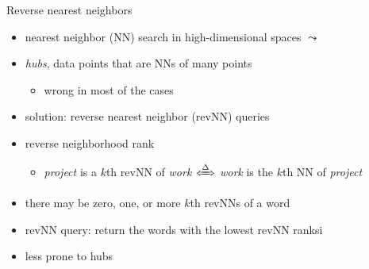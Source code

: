 \documentclass[10pt]{beamer}%
\newcommand{\bull}[1]{\begin{itemize}\item #1 \end{itemize}}
\begin{document}
\begin{frame}{Reverse nearest neighbors}
  \begin{itemize}
    \item nearest neighbor (NN) search in high-dimensional spaces $\leadsto$
    \item \emph{hubs}, data points that are NNs of many points
      \bull{wrong in most of the cases  \citep{Radovanovic:2010}}
    \item solution: reverse nearest neighbor (revNN) queries \\ \citep{Korn:2000}
    \item reverse neighborhood rank
      \bull{\emph{project} is a $k$th revNN of \emph{work}
      $\xLeftrightarrow\Delta$
      \emph{work} is the $k$th NN of \emph{project}}
    \item there may be zero, one, or more $k$th revNNs of a word
    \item revNN query: return the words with the lowest revNN ranksi
    \item less prone to hubs
  \end{itemize}
\end{frame}

\end{document}
